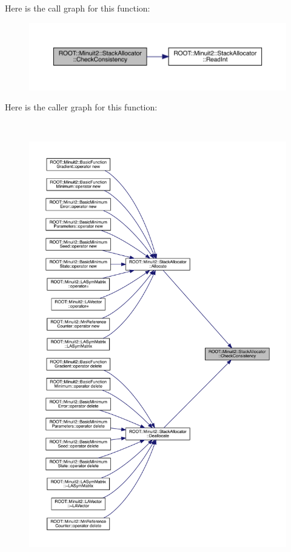 Here is the call graph for this function\+:
\nopagebreak
\begin{figure}[H]
\begin{center}
\leavevmode
\includegraphics[width=350pt]{d3/d1e/classROOT_1_1Minuit2_1_1StackAllocator_ad1189cdc76a07c36ef1924ad2488797d_cgraph}
\end{center}
\end{figure}
Here is the caller graph for this function\+:\nopagebreak
\begin{figure}[H]
\begin{center}
\leavevmode
\includegraphics[height=550pt]{d3/d1e/classROOT_1_1Minuit2_1_1StackAllocator_ad1189cdc76a07c36ef1924ad2488797d_icgraph}
\end{center}
\end{figure}
\mbox{\label{classROOT_1_1Minuit2_1_1StackAllocator_ad1189cdc76a07c36ef1924ad2488797d}} 
